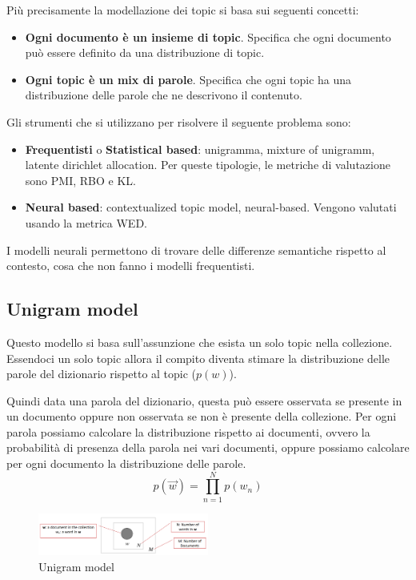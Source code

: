 Più precisamente la modellazione dei topic si basa sui seguenti concetti:
\begin{itemize}
      \item \textbf{Ogni documento è un insieme di topic}. Specifica che ogni
            documento può essere definito da una distribuzione di topic.
      \item \textbf{Ogni topic è un mix di parole}. Specifica che ogni topic ha
            una distribuzione delle parole che ne descrivono il contenuto.
\end{itemize}
Gli strumenti che si utilizzano per risolvere il seguente problema sono:
\begin{itemize}
      \item \textbf{Frequentisti} o \textbf{Statistical based}: unigramma, mixture
            of unigramm, latente dirichlet allocation. Per queste tipologie, le
            metriche di valutazione sono PMI, RBO e KL.
      \item \textbf{Neural based}: contextualized topic model, neural-based. Vengono
            valutati usando la metrica WED.
\end{itemize}

I modelli neurali permettono di trovare delle differenze semantiche rispetto al
contesto, cosa che non fanno i modelli frequentisti.
\subsection{Unigram model}
Questo modello si basa sull'assunzione che esista un solo topic nella collezione.
Essendoci un solo topic allora il compito diventa stimare la distribuzione delle
parole del dizionario rispetto al topic ($p(w)$).

Quindi data una parola del dizionario, questa può essere osservata se presente
in un documento oppure non osservata se non è presente della collezione.
Per ogni parola possiamo calcolare la distribuzione rispetto ai documenti,
ovvero la probabilità di presenza della parola nei vari documenti, oppure possiamo
calcolare per ogni documento la distribuzione delle parole.
\begin{equation}
      p(\vec{w}) = \prod_{n = 1}^{N} p(w_n)
\end{equation}
\begin{figure}[!ht]
      \centering
      \includegraphics[width=0.5\textwidth]{./img/nlp/unigram.png}
      \caption{Unigram model}
      \label{fig:unigram}
\end{figure}
